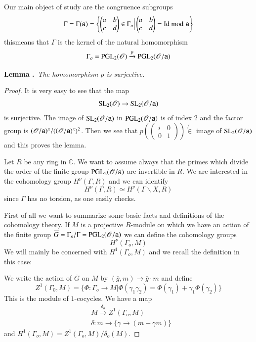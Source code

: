 Our main object of study are the congruence subgroups
$$
\Gamma=\Gamma (\mathsf{a})=\left\{\left(\begin{matrix}a & b\\ c & d\end{matrix}\right)\in \Gamma_{o}\Big| \left(\begin{matrix} a & b\\ c & d\end{matrix}\right)=\text{Id~}{\rm{mod}}\kern.3em \mathsf{a}\right\}
$$
this\pageoriginale means that $\Gamma$ is the kernel of the natural homomorphism
$$
\Gamma_{o}=\mathrm{PGL}_{2}(\mathscr{O})\xrightarrow{p}\mathrm{PGL}_{2}(\mathscr{O}/\mathsf{a})
$$

\smallskip
\noindent
{\bf Lemma .\label{art2-lem1.1.2}}~{\em The homomorphism $p$ is surjective.}

\begin{proof}
It is very easy to see that the map
$$
\mathrm{SL}_{2}(\mathscr{O})\to \mathrm{SL}_{2}(\mathscr{O}/\mathsf{a})
$$
is surjective. The image of $\mathrm{SL}_{2}(\mathscr{O}/\mathsf{a})$ in $\mathrm{PGL}_{2}(\mathscr{O}/\mathsf{a})$ is of index $2$ and the factor group is $(\mathscr{O}/\mathsf{a})^{x}/((\mathscr{O}/\mathsf{a})^{x})^{2}$. Then we see that $p\left(\left(\begin{smallmatrix} i & 0\\ 0 & 1\end{smallmatrix}\right)\right)\not{\in}$ image of $\mathrm{SL}_{2}(\mathscr{O}/\mathsf{a})$ and this proves the lemma.

Let $R$ be any ring in $\mathbb{C}$. We want to assume always that the primes which divide the order of the finite group $\mathrm{PGL}_{2}(\mathscr{O}/\mathsf{a})$ are invertible in $R$. We are interested in the cohomology group $H^{\nu}(\Gamma,R)$ and we can identify
$$
H^{\nu}(\Gamma,R)\simeq H^{\nu}(\Gamma\backslash X,R)
$$
since $\Gamma$ has no torsion, as one easily checks.

First of all we want to summarize some basic facts and definitions of the cohomology theory. If $M$ is a projective $R$-module on which we have an action of the finite group $\overline{G}=\Gamma_{o}/\Gamma=\mathrm{PGL}_{2}(\mathscr{O}/\mathsf{a})$ we can define the cohomology groups
$$
H^{\nu}(\Gamma_{o},M)
$$
We will mainly be concerned with $H^{1}(\Gamma_{o},M)$ and we recall the definition in this case:

We write the action of $\overline{G}$ on $M$ by $(\overline{g},m)\to \overline{g}\cdot m$ and define
$$
Z^{1}(\Gamma_{0},M)=\{\Phi:\Gamma_{o}\to M|\Phi(\gamma_{1}\gamma_{2})=\Phi(\gamma_{1})+\gamma_{1}\Phi(\gamma_{2})\}
$$
This is the module of $1$-cocycles. We have a map
\begin{align*}
& M \xrightarrow{\delta_{o}}Z^{1}(\Gamma_{o},M)\\
& \delta : m\to \{\gamma\to (m-\gamma m)\}
\end{align*}
and $H^{1}(\Gamma_{o},M)=Z^{1}(\Gamma_{o},M)/\delta_{o}(M)$. 


\end{proof}

